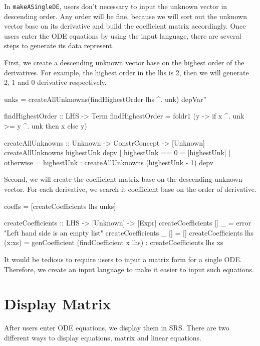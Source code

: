 In \verb|makeASingleDE|, users don't necessary to input the unknown vector in descending order. Any order will be fine, because we will sort out the unknown vector base on its derivative and build the coefficient matrix accordingly. Once users enter the ODE equations by using the input language, there are several steps to generate its data represent.

First, we create a descending unknown vector base on the highest order of the derivatives. For example, the highest order in the lhs is 2, then we will generate 2, 1 and 0 derivative respectively.

\begin{haskell1}
unks = createAllUnknowns(findHighestOrder lhs ^. unk) depVar''

findHighestOrder :: LHS -> Term
findHighestOrder = foldr1 (\x y -> if x ^. unk >= y ^. unk then x else y)

createAllUnknowns :: Unknown -> ConstrConcept -> [Unknown]
createAllUnknowns highestUnk depv
| highestUnk  == 0  = [highestUnk]
| otherwise = highestUnk : createAllUnknowns (highestUnk - 1) depv
\end{haskell1}

Second, we will create the coefficient matrix base on the descending unknown vector. For each derivative, we search it coefficient base on the order of derivative.

\begin{haskell1}
coeffs = [createCoefficients lhs unks]

createCoefficients :: LHS -> [Unknown] -> [Expr]
createCoefficients [] _ = error "Left hand side is an empty list"
createCoefficients _ [] = []
createCoefficients lhs (x:xs) = genCoefficient (findCoefficient x lhs) : createCoefficients lhs xs
\end{haskell1}

It would be tedious to require users to input a matrix form for a single ODE. Therefore, we create an input language to make it easier to input such equations.

\section{Display Matrix}
After users enter ODE equations, we display them in SRS. There are two different ways to display equations, matrix and linear equations.

